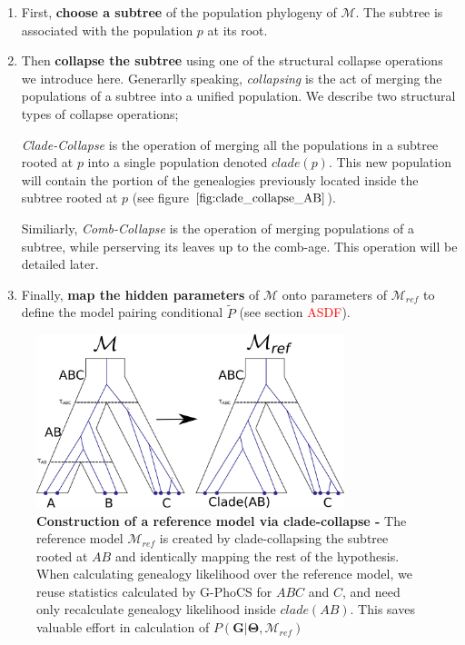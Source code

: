 \documentclass[11pt]{article}
\newcommand{\vect}[1]{\boldsymbol{\mathbf{#1}}}
\newcommand{\M}{\mathcal{M}}
\newcommand{\G}{\vect{G}}
\newcommand{\T}{\vect{\Theta}}
\newcommand{\Mref}{\M_{ref}}
\newcommand{\Pref}{\widetilde{P}}
\newcommand{\1}{\mathbbm{1}}
\newcommand{\gp}{G-PhoCS }
\begin{document}
\begin{enumerate}
\item First, \textbf{choose a subtree} of the population phylogeny of $\M$. The subtree is associated with the population $p$ at its root. 

\item Then \textbf{collapse the subtree} using one of the structural collapse operations we introduce here. Generarlly speaking, \textit{collapsing} is the act of merging the populations of a subtree into a unified population. We describe two structural types of collapse operations; 

\textit{Clade-Collapse} is the operation of merging all the populations in a subtree rooted at $p$ into a single population denoted $clade(p)$. This new population will contain the portion of the genealogies previously located inside the subtree rooted at $p$ (see figure $\ref{fig:clade_collapse_AB}$). 

Similiarly, \textit{Comb-Collapse} is the operation of merging populations of a subtree, while perserving its leaves up to the comb-age. This operation will be detailed later.


\item Finally, \textbf{map the hidden parameters} of $\M$ onto parameters of $\Mref$ to define the model pairing conditional $\Pref$ (see section \textcolor{red}{ASDF}).
\end{enumerate}
%
\begin{figure}[h]
\centering
\includegraphics[width=0.8\textwidth]
{clade_collapse_AB}
\caption{\textbf{Construction of a reference model via clade-collapse - } The reference model  $\Mref$ is created by clade-collapsing  the subtree rooted at $AB$ and identically mapping the rest of the hypothesis. When calculating genealogy likelihood over the reference model, we reuse statistics calculated by \gp for $ABC$ and $C$, and need only recalculate genealogy likelihood inside $clade(AB)$. This saves valuable effort in calculation of $P(\G|\T,\Mref)$}
\label{fig:clade_collapse_AB}
\end{figure}
\end{document}
